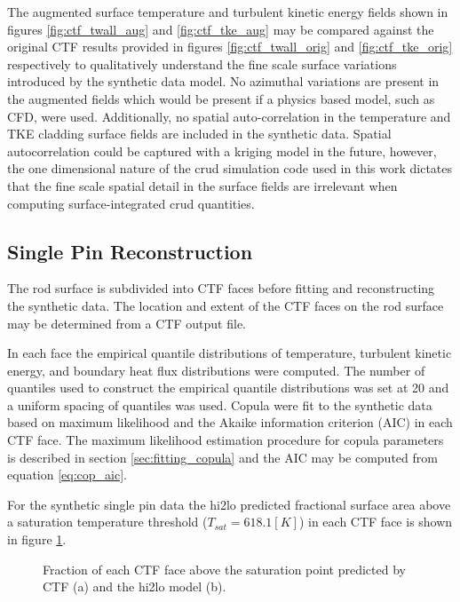 The augmented surface temperature and turbulent kinetic energy fields shown in figures \ref{fig:ctf_twall_aug} and \ref{fig:ctf_tke_aug} may be compared against the original CTF results provided in figures \ref{fig:ctf_twall_orig} and \ref{fig:ctf_tke_orig} respectively to qualitatively understand the fine scale surface variations introduced by the synthetic data model.  No azimuthal variations are present in the augmented fields which would be present if a physics based model, such as CFD, were used.  Additionally, no spatial auto-correlation in the temperature and TKE cladding surface fields are included in the synthetic data.  Spatial autocorrelation could be captured with a kriging model in the future, however, the one dimensional nature of the crud simulation code used in this work dictates that the fine scale spatial detail in the surface fields are irrelevant when computing surface-integrated crud quantities.


\subsection{Single Pin Reconstruction}

The rod surface is subdivided into CTF faces before fitting and reconstructing the synthetic data.  The location and extent of the CTF faces on the rod surface may be determined from a CTF output file.  

In each face the empirical quantile distributions of temperature, turbulent kinetic energy, and boundary heat flux distributions were computed.  The number of quantiles used to construct the empirical quantile distributions was set at 20 and a uniform spacing of quantiles was used.  Copula were fit to the synthetic data based on maximum likelihood and the Akaike information criterion (AIC) in each CTF face.  The maximum likelihood estimation procedure for copula parameters is described in section \ref{sec:fitting_copula} and the AIC may be computed from equation \ref{eq:cop_aic}.

For the synthetic single pin data the hi2lo predicted fractional surface area above a saturation temperature threshold ($T_{sat}=618.1[K]$) in each CTF face is shown in figure \ref{fig:frac_a}.

\begin{figure}[H]%
    \captionsetup[subfigure]{justification=centering}
    \centering
    \hspace*{-1.0em}%
    \caption{Fraction of each CTF face above the saturation point predicted by CTF (a) and the hi2lo model (b).}%
    \label{fig:frac_a}%
\end{figure}

